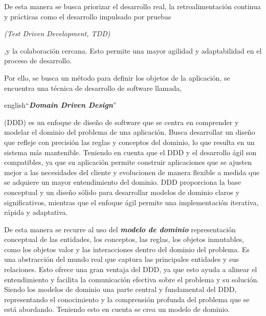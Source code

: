 De esta manera se busca priorizar el desarrollo real, la retroalimentación continua y prácticas como 
el desarrollo impulsado por pruebas \begin{otherlanguage}{english}\textit{(Test Driven Development, TDD)}\end{otherlanguage}  ,y la colaboración cercana. Esto permite una mayor 
agilidad y adaptabilidad en el proceso de desarrollo.

Por ello, se busca un método para definir los objetos de la aplicación, se encuentra una técnica de 
desarrollo de software llamada, \begin{otherlanguage}
{english}``\textit{\textbf{Domain Driven Design}}''\end{otherlanguage}(DDD) \cite{NvDDD} es un enfoque 
de diseño de software que se centra en comprender y modelar el dominio del problema de una aplicación. 
Busca desarrollar un diseño que refleje con precisión las reglas y conceptos del dominio, lo que 
resulta en un sistema más mantenible. Teniendo en cuenta que el DDD y el desarrollo ágil son 
compatibles, ya que su aplicación permite construir aplicaciones que se ajusten mejor a las necesidades 
del cliente y evolucionen de manera flexible a medida que se adquiere un mayor entendimiento del 
dominio. DDD proporciona la base conceptual y un diseño sólido para desarrollar modelos de dominio 
claros y significativos, mientras que el enfoque ágil permite una implementación iterativa, rápida y 
adaptativa.

De esta manera se recurre al uso del \textit{\textbf{modelo de dominio}} representación conceptual de 
las entidades, los conceptos, las reglas, los objetos inmutables, como los objetos valor y las 
interacciones dentro del dominio del problema. Es una abstracción del mundo real que captura las 
principales entidades y sus relaciones. Esto ofrece una gran ventaja del DDD, ya que esto ayuda a 
alinear el entendimiento y facilita la comunicación efectiva sobre el problema y su solución. Siendo 
los modelos de dominio una parte central y fundamental del DDD, representando el conocimiento y la 
comprensión profunda del problema que se está abordando. Teniendo esto en cuenta se crea un modelo de 
dominio.

